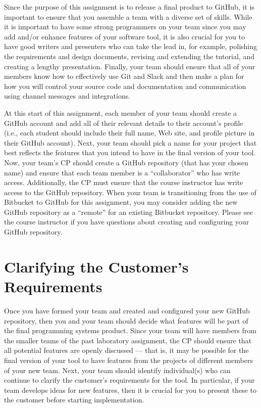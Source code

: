 Since the purpose of this assignment is to release a final product to GitHub, it is important to ensure that you
assemble a team with a diverse set of skills. While it is important to have some strong programmers on your team since
you may add and/or enhance features of your software tool, it is also crucial for you to have good writers and
presenters who can take the lead in, for example, polishing the requirements and design documents, revising and
extending the tutorial, and creating a lengthy presentation.  Finally, your team should ensure that all of your members
know how to effectively use Git and Slack and then make a plan for how you will control your source code and
documentation and communication using channel messages and integrations.

At this start of this assignment, each member of your team should create a GitHub account and add all of their relevant
details to their account's profile (i.e., each student should include their full name, Web site, and profile picture in
their GitHub account).  Next, your team should pick a name for your project that best reflects the features that you
intend to have in the final version of your tool. Now, your team's CP should create a GitHub repository (that has your
chosen name) and ensure that each team member is a ``collaborator'' who has write access. Additionally, the CP must
ensure that the course instructor has write access to the GitHub repository. When your team is transitioning from the
use of Bitbucket to GitHub for this assignment, you may consider adding the new GitHub repository as a ``remote'' for an
existing Bitbucket repository. Please see the course instructor if you have questions about creating and configuring
your GitHub repository.

\section*{Clarifying the Customer's Requirements}

Once you have formed your team and created and configured your new GitHub repository, then you and your team should
decide what features will be part of the final programming systems product. Since your team will have members from the
smaller teams of the past laboratory assignment, the CP should ensure that all potential features are openly discussed
--- that is, it may be possible for the final version of your tool to have features from the projects of different
members of your new team. Next, your team should identify individual(s) who can continue to clarify the customer's
requirements for the tool. In particular, if your team develops ideas for new features, then it is crucial for you to
present these to the customer before starting implementation.

